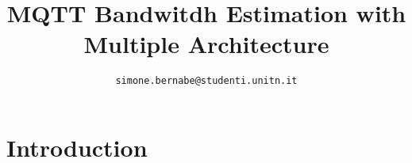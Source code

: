 \documentclass[journal]{IEEEtran}
\begin{document}
\title{MQTT Bandwitdh Estimation with Multiple Architecture}

\author{
	\texttt{simone.bernabe@studenti.unitn.it}
}

\makeatletter
\def\endthebibliography{%
	\def\@noitemerr{\@latex@warning{Empty `thebibliography' environment}}%
	\endlist
}
\makeatother


\maketitle

\begin{abstract}
	
\end{abstract}

\acresetall

\section{Introduction}
\label{sec:introduction}




\end{document}
